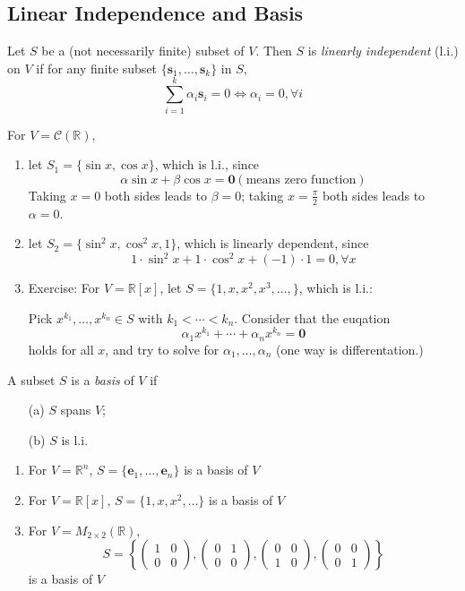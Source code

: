\subsection{Linear Independence and Basis}
\begin{definition}
Let $S$ be a (not necessarily finite) subset of $V$. Then $S$ is \emph{linearly independent} (l.i.) on $V$ if for any finite subset $\{\bm s_1,\dots,\bm s_k\}$ in $S$,
\[
\sum_{i=1}^k\alpha_i\bm s_i=0\Longleftrightarrow
\alpha_i=0,\forall i
\]
\end{definition}

\begin{example}
For $V=\mathcal{C}(\mathbb{R})$, 
\begin{enumerate}
\item
let $S_1=\{\sin x,\cos x\}$, which is l.i., since
\[
\alpha\sin x+\beta\cos x=\bm0 (\mbox{means zero function})
\]
Taking $x=0$ both sides leads to $\beta=0$; taking $x=\frac{\pi}{2}$ both sides leads to $\alpha=0$.
\item
let $S_2=\{\sin^2x,\cos^2x,1\}$, which is linearly dependent, since
 \[
 1\cdot\sin^2x+1\cdot\cos^2x+(-1)\cdot 1=0,\forall x
 \]
\item
Exercise: For $V=\mathbb{R}[x]$, let $S=\{1,x,x^2,x^3,\dots,\}$, which is l.i.:

Pick $x^{k_1},\dots,x^{k_n}\in S$ with $k_1<\cdots<k_n$. Consider that the euqation
\[
\alpha_1x^{k_1}+\cdots+\alpha_nx^{k_n}=\bm0
\]
holds for all $x$, and try to solve for $\alpha_1,\dots,\alpha_n$ (one way is differentation.)
\end{enumerate}
\end{example}
\begin{definition}[Basis]
A subset $S$ is a \emph{basis} of $V$ if 
\begin{enumerate}
\item[(a)]
$S$ spans $V$;
\item[(b)]
$S$ is l.i.
\end{enumerate}
\end{definition}
\begin{example}
\begin{enumerate}
\item
For $V=\mathbb{R}^n$, $S=\{\bm e_1,\dots,\bm e_n\}$ is a basis of $V$
\item
For $V=\mathbb{R}[x]$, $S=\{1,x,x^2,\dots\}$ is a basis of $V$
\item
For $V=M_{2\times 2}(\mathbb{R})$, 
\[
S=\left\{
\begin{pmatrix}
1&0\\0&0
\end{pmatrix},
\begin{pmatrix}
0&1\\0&0
\end{pmatrix},
\begin{pmatrix}
0&0\\1&0
\end{pmatrix},
\begin{pmatrix}
0&0\\0&1
\end{pmatrix}
\right\}
\]
is a basis of $V$
\end{enumerate}
\end{example}
